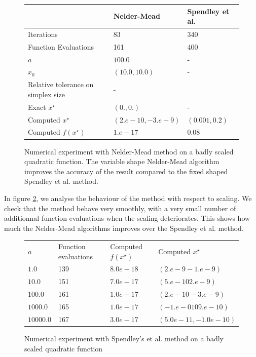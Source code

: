 \begin{figure}[h]
\begin{center}
\begin{tiny}
\begin{tabular}{|l|l|l|}
\hline
& Nelder-Mead & Spendley et al.\\
\hline
Iterations & 83  & 340 \\
Function Evaluations & 161 & 400 \\
$a$ & $100.0$ & - \\
$x_0$ & $(10.0,10.0)$ & - \\
Relative tolerance on simplex size & - \\
Exact $x^\star$ & $(0.,0.)$ & -\\
Computed $x^\star$ & $(2.e-10, -3.e-9)$& $(0.001,0.2)$\\
Computed $f(x^\star)$ & $1.e-17$ & $0.08$\\
\hline
\end{tabular}
\end{tiny}
\end{center}
\caption{Numerical experiment with Nelder-Mead method on a badly scaled quadratic function.
The variable shape Nelder-Mead algorithm improves the accuracy of the result compared
to the fixed shaped Spendley et al. method.}
\label{fig-nm-numexp2-table}
\end{figure}

In figure \ref{fig-nm-numexp2-scaling}, we analyse the 
behaviour of the method with respect to scaling.
We check that the method behave very smoothly, with a very 
small number of additionnal function evaluations when the 
scaling deteriorates. This shows how much the Nelder-Mead algorithms 
improves over the Spendley et al. method.

\begin{figure}[htbp]
\begin{center}
\begin{tiny}
\begin{tabular}{|l|l|l|l|}
\hline
$a$ & Function evaluations & Computed $f(x^\star)$ & Computed $x^\star$\\
$1.0$ & 139 & $8.0e-18$ & $(2.e-9 -1.e-9)$\\
$10.0$ & 151 & $7.0e-17$ & $(5.e-10 2.e-9)$\\
$100.0$ & 161 & $1.0e-17$ & $(2.e-10 -3.e-9)$ \\
$1000.0$ & 165 & $1.0e-17$ & $(-1.e-010 9.e-10)$\\
$10000.0$ & 167 & $3.0e-17$ & $(5.0e-11,-1.0e-10)$ \\
\hline
\end{tabular}
\end{tiny}
\end{center}
\caption{Numerical experiment with Spendley's et al. method on a badly scaled quadratic function}
\label{fig-nm-numexp2-scaling}
\end{figure}


